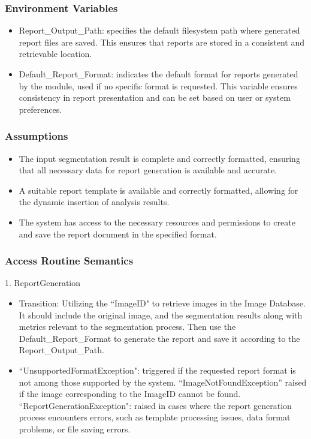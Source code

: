 \documentclass[12pt, titlepage]{article}
\begin{document}
\subsubsection{Environment Variables}

\begin{itemize}
    \item Report\_Output\_Path: specifies the default filesystem path where generated report files are saved. This ensures that reports are stored in a consistent and retrievable location.
    \item Default\_Report\_Format: indicates the default format for reports generated by the module, used if no specific format is requested. This variable ensures consistency in report presentation and can be set based on user or system preferences.

\end{itemize}

\subsubsection{Assumptions}
\begin{itemize}
    \item The input segmentation result is complete and correctly formatted, ensuring that all necessary data for report generation is available and accurate.
    \item A suitable report template is available and correctly formatted, allowing for the dynamic insertion of analysis results.
    \item The system has access to the necessary resources and permissions to create and save the report document in the specified format.
\end{itemize}

\subsubsection{Access Routine Semantics}
1. ReportGeneration
\begin{itemize}
\item Transition: Utilizing the ``ImageID" to retrieve images in the Image Database. It should include the original image, and the segmentation results along with metrics relevant to the segmentation process. Then use the Default\_Report\_Format to generate the report and save it according to the Report\_Output\_Path. 

\item ``UnsupportedFormatException": triggered if the requested report format is not among those supported by the system. “ImageNotFoundException” raised if the image corresponding to the ImageID cannot be found. ``ReportGenerationException": raised in cases where the report generation process encounters errors, such as template processing issues, data format problems, or file saving errors.
\end{itemize}
\end{document}
